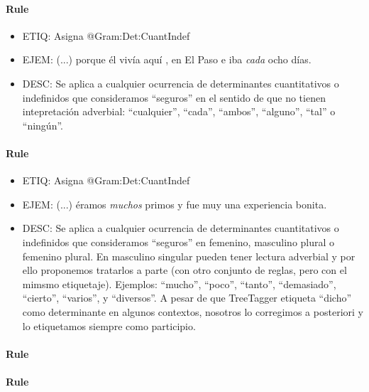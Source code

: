 \documentclass[11pt]{report}
\begin{document}
\paragraph*{Rule}
\begin{itemize}
\item ETIQ: Asigna @Gram:Det:CuantIndef
\item EJEM: (...) porque él vivía aquí , en El Paso e iba \emph{cada} ocho días.
\item DESC: Se aplica a cualquier ocurrencia de determinantes cuantitativos o indefinidos que consideramos ``seguros'' en el sentido de que no tienen intepretación adverbial: ``cualquier'', ``cada'', ``ambos'', ``alguno'', ``tal'' o ``ningún''.
\end{itemize}

\paragraph*{Rule}
\begin{itemize}
\item ETIQ: Asigna @Gram:Det:CuantIndef
\item EJEM: (...) éramos \emph{muchos} primos y fue muy una experiencia bonita.
\item DESC: Se aplica a cualquier ocurrencia de determinantes cuantitativos o indefinidos que consideramos ``seguros'' en femenino, masculino plural o femenino plural. En masculino singular pueden tener lectura adverbial y por ello proponemos tratarlos a parte (con otro conjunto de reglas, pero con el mimsmo etiquetaje). Ejemplos: ``mucho'', ``poco'', ``tanto'', ``demasiado'', ``cierto'', ``varios'', y ``diversos''. A pesar de que TreeTagger etiqueta  ``dicho'' como determinante en algunos contextos, nosotros lo corregimos a posteriori y lo etiquetamos siempre como participio.
\end{itemize}

\paragraph*{Rule}
\paragraph*{Rule}
\end{document}
